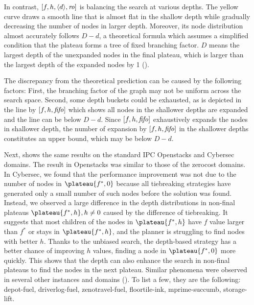 In contrast, $[f,h,{\left<d\right>},{\text{\textit{ro}}}]$ is balancing the search at various depths.
The yellow curve draws a smooth line that is almost flat in the shallow depth while gradually decreasing the number of nodes in larger depth.
Moreover, its node distribution almost accurately follows $D-d$, a theoretical formula which assumes a simplified
condition that the plateau forms a tree of fixed branching factor.
$D$ means the largest depth of the unexpanded nodes in the final plateau, which is
larger than the largest depth of the expanded nodes by 1
().

The discrepancy from the theoretical prediction can be caused by the 
following factors: First, the branching factor of the graph may not be
uniform across the search space. Second, some depth buckets could be
exhausted, as is depicted in the line by $[f,h,{\text{\textit{fifo}}}]$ which
shows all nodes in the shallower depths are expanded and the line can be below $D-d$.
Since $[f,h,{\text{\textit{fifo}}}]$ exhaustively expands the nodes in shallower depth,
the number of expansion by $[f,h,{\text{\textit{fifo}}}]$ in the shallower depths constitutes an upper bound, which may be below $D-d$.

Next,  shows the same results on the standard IPC
Openstacks and Cybersec domains.
The result in Openstacks was similar to those of the zerocost domains.
In Cybersec,
we found that the performance improvement was not due to the number of nodes in $\plateau{f^*,0}$ because all tiebreaking strategies have generated only a small number of such nodes before the solution was found.
Instead, we observed a large difference in the depth distributions in non-final plateaus $\plateau{f^*,h}, h\not=0$ caused by the difference of tiebreaking.
It suggests that most children of the nodes in $\plateau{f^*,h}$ have $f$ value larger than $f^*$ or stays in $\plateau{f^*,h}$, and the planner is struggling to find nodes with better $h$.
Thanks to the unbiased search, the depth-based strategy has a better chance of improving $h$ values, finding a node in $\plateau{f^*,0}$ more quickly.
This shows that the depth can also enhance the search in non-final plateaus to find the nodes in the next plateau.
Similar phenomena were observed in several other instances and domains (). To list a few, they are the following: depot-fuel, driverlog-fuel, zenotravel-fuel, floortile-ink, mprime-succumb, storage-lift.

